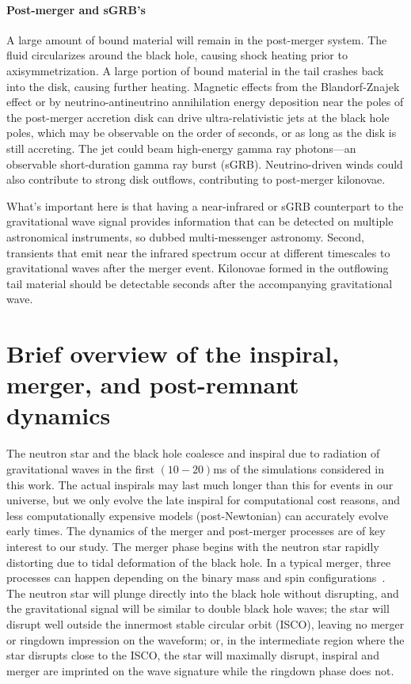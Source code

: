 \paragraph{Post-merger and sGRB's}
A large amount of bound material will remain in the post-merger system.  
The fluid circularizes around the black hole, causing shock heating prior to axisymmetrization. 
A large portion of bound material in the tail crashes back into the disk, causing further heating.
Magnetic effects from the Blandorf-Znajek effect or by neutrino-antineutrino annihilation energy deposition near the poles of the post-merger accretion disk can drive ultra-relativistic jets at the black hole poles, which may be observable on the order of seconds, or as long as the disk is still accreting.
The jet could beam high-energy gamma ray photons---an observable short-duration gamma ray burst (sGRB).
Neutrino-driven winds could also contribute to strong disk outflows, contributing to post-merger kilonovae.

What's important here is that having a near-infrared or sGRB counterpart to the gravitational wave signal provides information that can be detected on multiple astronomical instruments, so dubbed multi-messenger astronomy.
Second, transients that emit near the infrared spectrum occur at different timescales to gravitational waves after the merger event.
Kilonovae formed in the outflowing tail material should be detectable seconds after the accompanying gravitational wave.  



\section{Brief overview of the inspiral, merger, and post-remnant dynamics}

The neutron star and the black hole coalesce and inspiral due to radiation of gravitational waves in the first $(10-20)$ms of the simulations considered in this work.  
The actual inspirals may last much longer than this for events in our universe, but we only evolve the late inspiral for computational cost reasons, and less computationally expensive models (post-Newtonian) can accurately evolve early times.
The dynamics of the merger and post-merger processes are of key interest to our study.
The merger phase begins with the neutron star rapidly distorting due to tidal deformation of the black hole.
In a typical merger, three processes can happen depending on the binary mass and spin configurations~\cite{Shibata:2009cn}.  The neutron star will plunge directly into the black hole without disrupting, and the gravitational signal will be similar to double black hole waves; the star will disrupt well outside the innermost stable circular orbit (ISCO), leaving no merger or ringdown impression on the waveform; or, in the intermediate region where the star disrupts close to the ISCO, the star will maximally disrupt, inspiral and merger are imprinted on the wave signature while the ringdown phase does not.

